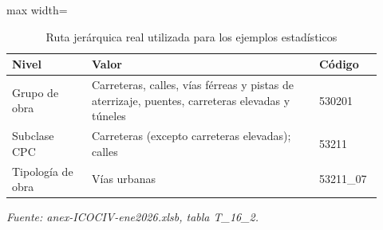 \begin{table}[H]
\centering
\caption{Ruta jerárquica real utilizada para los ejemplos estadísticos}
\label{tab:ejemplo_ruta_vias_urbanas}
\scriptsize
\begin{adjustbox}{max width=\linewidth}
\begin{tabular}{p{0.20\linewidth}p{0.58\linewidth}p{0.14\linewidth}}
\toprule
Nivel & Valor & Código \\
\midrule
Grupo de obra & Carreteras, calles, vías férreas y pistas de aterrizaje, puentes, carreteras elevadas y túneles & 530201 \\
Subclase CPC & Carreteras (excepto carreteras elevadas); calles & 53211 \\
Tipología de obra & Vías urbanas & 53211\_07 \\
\bottomrule
\end{tabular}
\end{adjustbox}
\par\footnotesize\textit{Fuente: anex-ICOCIV-ene2026.xlsb, tabla T\_16\_2.}
\end{table}
